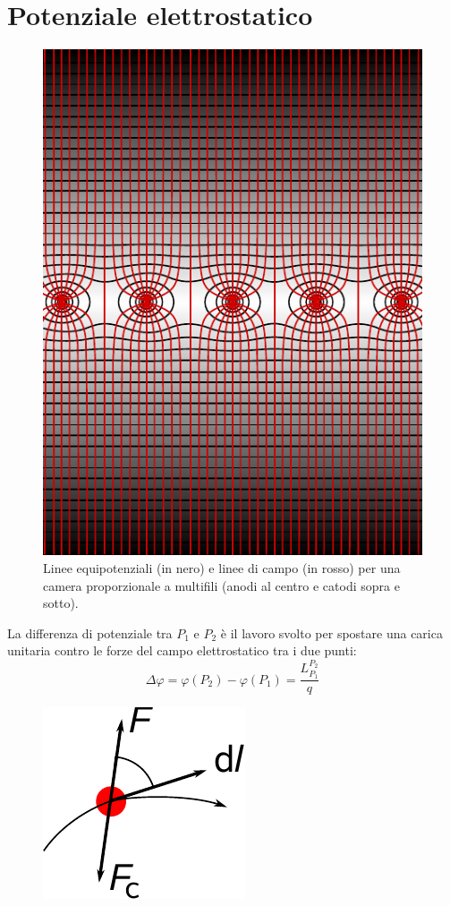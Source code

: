 \section{Potenziale elettrostatico}
\begin{figure}[htp]
 \centering
 \includegraphics{immagini/fisica2/MWPC}
 \caption{Linee equipotenziali (in nero) e linee di campo (in rosso) per una camera proporzionale a multifili (anodi al centro e catodi sopra e sotto).}
\end{figure}
\begin{Def}
La differenza di potenziale tra $P_1$ e $P_2$ è il lavoro svolto per spostare una carica unitaria contro le forze del campo elettrostatico tra i due punti:
\begin{equation}
 \Delta\varphi=\varphi(P_2)-\varphi(P_1)=\frac{L_{P_1}^{P_2}}{q} 
\end{equation}
\end{Def}
\begin{figure}[htp]
 \centering
 \includegraphics{immagini/fisica2/lavoro_campo}
\end{figure}

